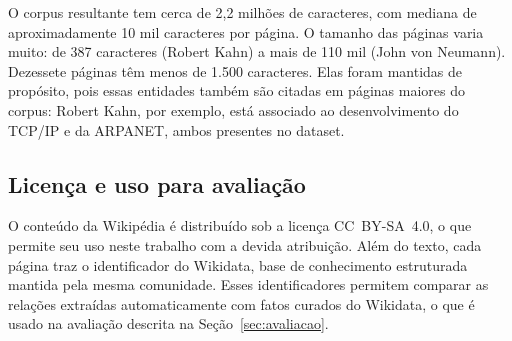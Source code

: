 O corpus resultante tem cerca de 2,2 milhões de caracteres, com mediana de aproximadamente 10 mil caracteres por página. O tamanho das páginas varia muito: de 387 caracteres (Robert Kahn) a mais de 110 mil (John von Neumann). Dezessete páginas têm menos de 1.500 caracteres. %
Elas foram mantidas de propósito, pois essas entidades também são citadas em páginas maiores do corpus: Robert Kahn, por exemplo, está associado ao desenvolvimento do TCP/IP e da ARPANET, ambos presentes no dataset.

\subsection{Licença e uso para avaliação}

O conteúdo da Wikipédia é distribuído sob a licença CC~BY-SA~4.0, o que permite seu uso neste trabalho com a devida atribuição. Além do texto, cada página traz o identificador do Wikidata, base de conhecimento estruturada mantida pela mesma comunidade. Esses identificadores permitem comparar as relações extraídas automaticamente com fatos curados do Wikidata, o que é usado na avaliação descrita na Seção~\ref{sec:avaliacao}.
